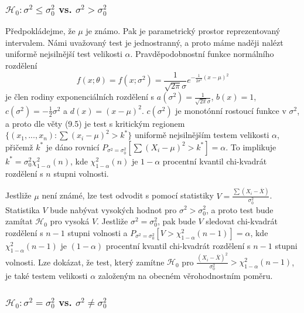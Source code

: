 \subsubsection{$\mathscr{H}_0: \sigma^2 \le \sigma_0^2$ vs. $\sigma^2 > \sigma_0^2$}

Předpokládejme, že $\mu$ je známo. Pak je parametrický prostor reprezentovaný intervalem. Námi uvažovaný test je jednostranný, a proto máme naději nalézt uniformě nejsilnější test velikosti $\alpha$. Pravděpodobnostní funkce normálního rozdělení
\begin{equation*}
f(x; \theta) = f(x; \sigma^2) = \frac{1}{\sqrt{2 \pi} \sigma}e^{-\frac{1}{2 \sigma^2}(x - \mu)^2}
\end{equation*}
je člen rodiny exponenciálních rozdělení s $a(\sigma^2) = \frac{1}{\sqrt{2 \pi} \sigma}$, $b(x) = 1$, $c(\sigma^2) = -\frac{1}{2}\sigma^2$ a $d(x) = (x - \mu)^2$. $c(\sigma^2)$ je monotónní rostoucí funkce v $\sigma^2$, a proto dle věty (9.5) je test s kritickým regionem $\{(x_1, ..., x_n): \sum (x_i - \mu)^2 > k^*\}$ uniformě nejsilnějším testem velikosti $\alpha$, přičemž $k^*$ je dáno rovnicí $P_{\sigma^2 = \sigma_0^2}[\sum (X_i - \mu)^2 > k^*] = \alpha$. To implikuje $k^* = \sigma_0^2 \chi_{1 - \alpha}^2(n)$, kde $\chi_{1 - \alpha}^2(n)$ je $1 - \alpha$ procentní kvantil chi-kvadrát rozdělení s $n$ stupni volnosti.

Jestliže $\mu$ není známé, lze test odvodit s pomocí statistiky $V = \frac{\sum(X_i - \overline{X})}{\sigma_0^2}$. Statistika $V$ bude nabývat vysokých hodnot pro $\sigma^2 > \sigma_0^2$, a proto test bude zamítat $\mathscr{H}_0$ pro vysoká $V$. Jestliže $\sigma^2 = \sigma_0^2$, pak bude $V$ sledovat chi-kvadrát rozdělení s $n - 1$ stupni volnosti a $P_{\sigma^2 = \sigma_0^2}[V > \chi_{1 - \alpha}^2(n - 1)] = \alpha$, kde $\chi_{1 - \alpha}^2(n - 1)$ je $(1 - \alpha)$ procentní kvantil chi-kvadrát rozdělení s $n - 1$ stupni volnosti. Lze dokázat, že test, který zamítne $\mathscr{H}_0$ pro $\frac{(X_i - \overline{X})^2}{\sigma_0^2} > \chi_{1 - \alpha}^2(n - 1)$, je také testem velikosti $\alpha$ založeným na obecném věrohodnostním poměru.

\subsubsection{$\mathscr{H}_0: \sigma^2 = \sigma_0^2$ vs. $\sigma^2 \neq \sigma_0^2$}

